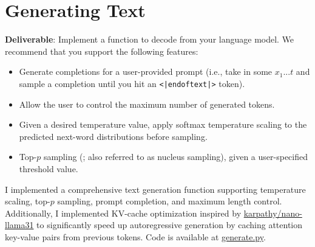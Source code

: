 \section{Generating Text}


\textbf{Deliverable}: Implement a function to decode from your language model. We recommend that you support the following features:

\begin{itemize}
    \item Generate completions for a user-provided prompt (i.e., take in some $x_1...t$ and sample a completion until you hit an \lstinline{<|endoftext|>} token).
    \item Allow the user to control the maximum number of generated tokens.
    \item Given a desired temperature value, apply softmax temperature scaling to the predicted next-word distributions before sampling.
    \item Top-$p$ sampling (\citet{holtzman2019curious}; also referred to as nucleus sampling), given a user-specified threshold value.
\end{itemize}

\begin{answer}
I implemented a comprehensive text generation function supporting temperature scaling, top-$p$ sampling, prompt completion, and maximum length control. Additionally, I implemented KV-cache optimization inspired by \href{https://github.com/karpathy/nano-llama31/blob/master/llama31.py}{karpathy/nano-llama31} to significantly speed up autoregressive generation by caching attention key-value pairs from previous tokens. 
Code is available at \href{https://github.com/donglinkang2021/cs336-assignment1-basics/blob/main/cs336_basics/generate.py}{generate.py}.
\end{answer}
